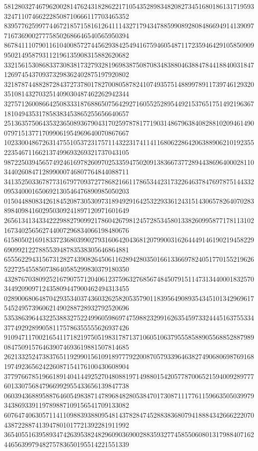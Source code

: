 \begin{DoxyCode}
      581280327467962002814762431828622171054352898348208273451680186131719593324711074662228508710666117703465352
      839577625997744672185715816126411143271794347885990892808486694914139097716736900277758502686646540565950394
      867841110790116104008572744562938425494167594605487117235946429105850909950214958793112196135908315882620682
      332156153086833730838173279328196983875087083483880463884784418840031847126974543709373298362402875197920802
      321878744882872843727378017827008058782410749357514889978911739746129320351081432703251409030487462262942344
      327571260086642508333187688650756429271605525289544921537651751492196367181049435317858383453865255656640657
      251363575064353236508936790431702597878177190314867963840828810209461490079715137717099061954969640070867667
      102330048672631475510537231757114322317411411680622864206388906210192355223546711662137499693269321737043105
      987225039456574924616978260970253359475020913836673772894438696400028110344026084712899000746807764844088711
      341352503367877316797709372778682166117865344231732264637847697875144332095340001650692130546476890985050203
      015044880834261845208730530973189492916425322933612431514306578264070283898409841602950309241897120971601649
      265613413433422298827909921786042679812457285345801338260995877178113102167340256562744007296834066198480676
      615805021691833723680399027931606420436812079900316264449146190219458229690992122788553948783538305646864881
      655562294315673128274390826450611628942803501661336697824051770155219626522725455850738640585299830379180350
      432876703809252167907571204061237596327685674845079151147313440001832570344920909712435809447900462494313455
      028900680648704293534037436032625820535790118395649089354345101342969617545249573960621490288728932792520696
      535386396443225388327522499605986974759882329916263545973324445163755334377492928990581175786355555626937426
      910947117002165411718219750519831787137106051063795558588905568852887989084750915764639074693619881507814685
      262133252473837651192990156109189777922008705793396463827490680698769168197492365624226087154176100430608904
      377976678519661891404144925270480881971498801542057787006521594009289777601330756847966992955433656139847738
      060394368895887646054983871478968482805384701730871117761159663505039979343869339119789887109156541709133082
      607647406305711411098839388095481437828474528838368079418884342666222070438722887413947801017721392281911992
      365405516395893474263953824829609036900288359327745855060801317988407162446563997948275783650195514221551339

\end{DoxyCode}

